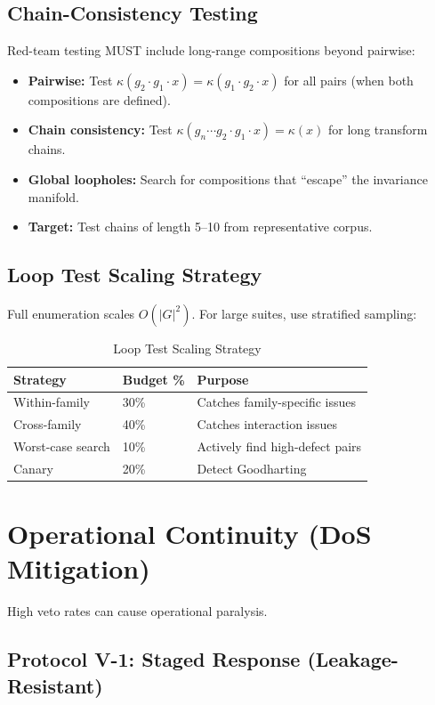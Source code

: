 \documentclass[11pt,letterpaper]{article}
\theoremstyle{definition}
\theoremstyle{remark}
\begin{document}
\subsection{Chain-Consistency Testing}

Red-team testing MUST include long-range compositions beyond pairwise:
\begin{itemize}
\item \textbf{Pairwise:} Test $\kappa(g_2 \cdot g_1 \cdot x) = \kappa(g_1 \cdot g_2 \cdot x)$ for all pairs (when both compositions are defined).
\item \textbf{Chain consistency:} Test $\kappa(g_n \cdots g_2 \cdot g_1 \cdot x) = \kappa(x)$ for long transform chains.
\item \textbf{Global loopholes:} Search for compositions that ``escape'' the invariance manifold.
\item \textbf{Target:} Test chains of length 5--10 from representative corpus.
\end{itemize}

\subsection{Loop Test Scaling Strategy}

Full enumeration scales $O(|G|^2)$. For large suites, use stratified sampling:

\begin{table}[h]
\centering
\begin{tabular}{@{}lll@{}}
\toprule
\textbf{Strategy} & \textbf{Budget \%} & \textbf{Purpose} \\
\midrule
Within-family & 30\% & Catches family-specific issues \\
Cross-family & 40\% & Catches interaction issues \\
Worst-case search & 10\% & Actively find high-defect pairs \\
Canary & 20\% & Detect Goodharting \\
\bottomrule
\end{tabular}
\caption{Loop Test Scaling Strategy}
\end{table}


\section{Operational Continuity (DoS Mitigation)}

High veto rates can cause operational paralysis.

\subsection{Protocol V-1: Staged Response (Leakage-Resistant)}
\end{document}
